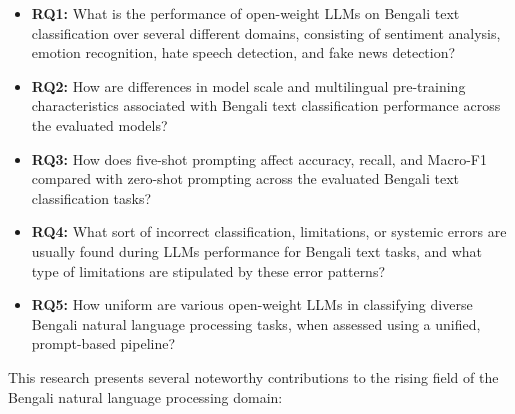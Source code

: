 \documentclass[10pt,letterpaper]{article}
\begin{document}
\begin{itemize}
\setlength{\itemsep}{0pt}
\setlength{\parskip}{0pt}
    \item \textbf{RQ1:} What is the performance of open-weight LLMs on Bengali text classification over several different domains, consisting of sentiment analysis, emotion recognition, hate speech detection, and fake news detection?
    \item \textbf{RQ2:} How are differences in model scale and multilingual pre-training characteristics associated with Bengali text classification performance across the evaluated models?
    \item \textbf{RQ3:} How does five-shot prompting affect accuracy, recall, and Macro-F1 compared with zero-shot prompting across the evaluated Bengali text classification tasks?
    \item \textbf{RQ4:} What sort of incorrect classification, limitations, or systemic errors are usually found during LLMs performance for Bengali text tasks, and what type of limitations are stipulated by these error patterns?
    \item \textbf{RQ5:} How uniform are various open-weight LLMs in classifying diverse Bengali natural language processing tasks, when assessed using a unified, prompt-based pipeline?
\end{itemize}

This research presents several noteworthy contributions to the rising field of the Bengali natural language processing domain:
\end{document}
